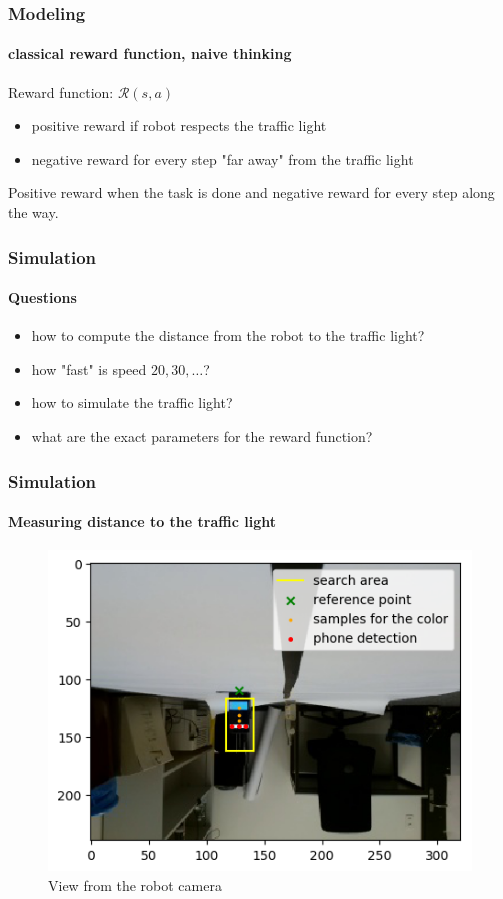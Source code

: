 \documentclass[dvipsnames,svgnames]{beamer}
\begin{document}
\begin{frame}
\frametitle{Modeling}
\framesubtitle{classical reward function, naive thinking}
\begin{block}{Reward function: $\mathcal{R}(s,a)$}
\begin{itemize}
\item positive reward if robot respects the traffic light
\item negative reward for every step "far away" from the traffic light
\end{itemize}
\end{block}

Positive reward when the task is done and negative reward for every step along the way.
\end{frame}


\begin{frame}
\frametitle{Simulation}
\framesubtitle{Questions}
\begin{block}{}
\begin{itemize}
\item how to compute the distance from the robot to the traffic light? 
\item how "fast" is speed $20, 30, \ldots$? 
\item how to simulate the traffic light? 
\item what are the exact parameters for the reward function? 
\end{itemize}
\end{block}
\vspace{1cm}
\end{frame}

\begin{frame}
\frametitle{Simulation}
\framesubtitle{Measuring distance to the traffic light}
\begin{figure}[H]
\captionsetup{justification=centering,margin=0cm}
\centering
\includegraphics[scale=0.7]{img/vue46.png}
\caption{View from the robot camera}
\end{figure}
\end{frame}
\end{document}
